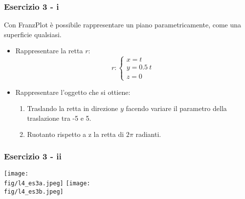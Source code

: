 \documentclass{beamer}
\newcommand{\fig}{./figures} %
\newcommand{\frnzplt}{FranzPlot }
\begin{document}
%
\begin{frame}
\frametitle{Esercizio 3 - i}
Con \frnzplt \`e possibile rappresentare un piano parametricamente, come una superficie qualsiasi.
\begin{itemize}
\item Rappresentare la retta $r$:
\begin{displaymath}
r:\begin{cases}
x = t \\
y = 0.5~t\\
z = 0
\end{cases}
\end{displaymath}
\item Rappresentare l'oggetto che si ottiene: 
\begin{enumerate}
\item Traslando la retta in direzione $y$ facendo variare il parametro della traslazione tra -5 e 5.
\item Ruotanto rispetto a z la retta di $2\pi$ radianti.
\end{enumerate}
\end{itemize}
\end{frame}
\begin{frame}
\frametitle{Esercizio 3 - ii}
\begin{center}
\texttt{[image: \\fig/l4\_es3a.jpeg]}
\texttt{[image: \\fig/l4\_es3b.jpeg]}
\end{center}
\end{frame}
\end{document}
